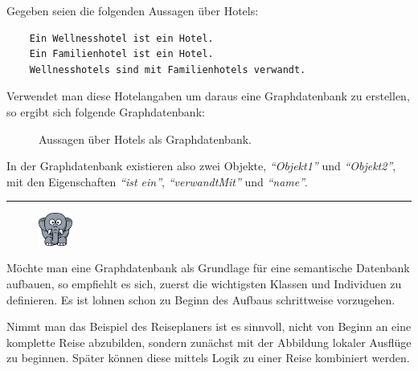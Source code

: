 \newpage

Gegeben seien die folgenden Aussagen über Hotels:
\begin{lstlisting}
    Ein Wellnesshotel ist ein Hotel.
    Ein Familienhotel ist ein Hotel.
    Wellnesshotels sind mit Familienhotels verwandt.
\end{lstlisting}

Verwendet man diese Hotelangaben um daraus eine Graphdatenbank zu erstellen, so ergibt sich folgende Graphdatenbank:
\begin{figure}[htbp]
\centering {}
\caption{Aussagen über Hotels als Graphdatenbank.\label{fig:hotels_graphdatenbank}\protect\footnotemark}
\end{figure}

In der Graphdatenbank existieren also zwei Objekte, \textit{``Objekt1''} und \textit{``Objekt2''}, mit den Eigenschaften \textit{``ist ein''}, \textit{``verwandtMit''} und \textit{``name''}.

\newpage

\noindent\rule[1ex]{\textwidth}{1pt}
\begin{figure}
    \vspace{-12pt}
    \includegraphics[width=0.1\textwidth]{bilder/elephant.png}
\end{figure}
\label{elephant_graph_data}
Möchte man eine Graphdatenbank als Grundlage für eine semantische Datenbank aufbauen, so empfiehlt es sich, zuerst die wichtigsten Klassen und Individuen zu definieren. Es ist lohnen schon zu Beginn des Aufbaus schrittweise vorzugehen.

Nimmt man das Beispiel des Reiseplaners ist es sinnvoll, nicht von Beginn an eine komplette Reise abzubilden, sondern zunächst mit der Abbildung lokaler Ausflüge zu beginnen. Später können diese mittels Logik zu einer Reise kombiniert werden.

